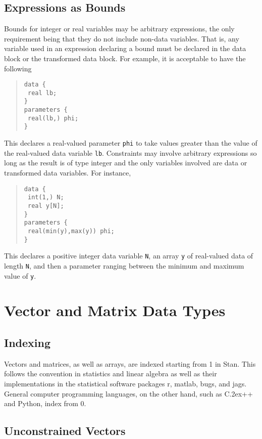 \documentclass[10pt]{report}
\newcommand{\Stan}{Stan\xspace}
\newcommand*{\Cpp}{C\raise.2ex\hbox{\footnotesize ++}\xspace} %
\newcommand{\acronym}[1]{{\sc #1}\xspace}
\newcommand{\MATLAB}{\acronym{matlab}}
\newcommand{\R}{\acronym{r}}
\newcommand{\BUGS}{\acronym{bugs}}
\newcommand{\JAGS}{\acronym{jags}}
\newcommand{\code}[1]{{\tt #1}}
\begin{document}
\subsection{Expressions as Bounds}

Bounds for integer or real variables may be arbitrary expressions, the
only requirement being that they do not include non-data variables.
That is, any variable used in an expression declaring a bound must be
declared in the data block or the transformed data block.  For
example, it is acceptable to have the following
%
\begin{quote}
\begin{Verbatim}
data { 
 real lb;
}
parameters {
 real(lb,) phi;
}
\end{Verbatim}
\end{quote}
%
This declares a real-valued parameter \code{phi} to take values
greater than the value of the real-valued data variable \code{lb}.
Constraints may involve arbitrary expressions so long as the result is
of type integer and the only variables involved are data or
transformed data variables.  For instance,
\begin{quote}
\begin{Verbatim}
data { 
 int(1,) N;
 real y[N];
}
parameters {
 real(min(y),max(y)) phi;
}
\end{Verbatim}
\end{quote}
%
This declares a positive integer data variable \code{N}, an array \code{y} of
real-valued data of length \code{N}, and then a parameter ranging
between the minimum and maximum value of \code{y}.


\section{Vector and Matrix Data Types}

\subsection{Indexing}

Vectors and matrices, as well as arrays, are indexed starting from 1
in \Stan.  This follows the convention in statistics and linear
algebra as well as their implementations in the statistical software
packages \R, \MATLAB, \BUGS, and \JAGS.  General computer programming
languages, on the other hand, such as \Cpp and Python, index from 0.


\subsection{Unconstrained Vectors}
\end{document}

